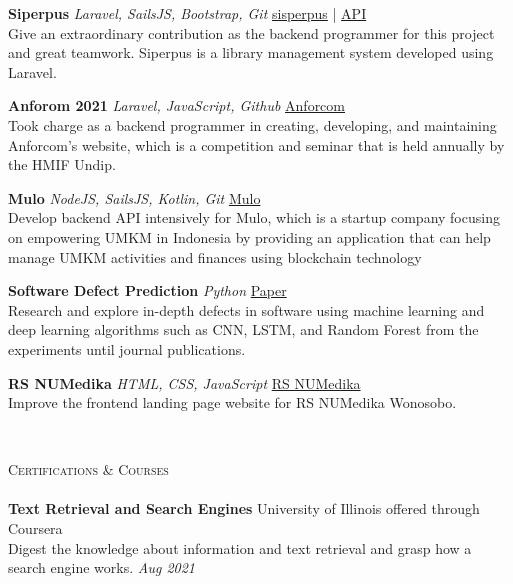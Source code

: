 \documentclass[a4paper]{article}
\newcommand{\lineunder} {
    \vspace*{-8pt} \\
    \hspace*{-18pt} \hrulefill \\
}
\newcommand{\header} [1] {
    {\hspace*{-18pt}\vspace*{6pt} \textsc{#1}}
    \vspace*{-6pt} \lineunder
}
\begin{document}
{\textbf{Siperpus}} {\sl Laravel, SailsJS, Bootstrap, Git} \hfill \href{http://sisperpus.herokuapp.com/}{sisperpus} | \href{https://pbp-siperpus.herokuapp.com/}{API}\\
Give an extraordinary contribution as the backend programmer for this project and great teamwork. Siperpus is a library management system developed using Laravel. \\
\vspace*{2mm}

{\textbf{Anforom 2021}} {\sl Laravel, JavaScript, Github} \hfill \href{https://anforcom.com}{Anforcom}\\
Took charge as a backend programmer in creating, developing, and maintaining Anforcom's website, which is a competition and seminar that is held annually by the HMIF Undip.\\
\vspace*{2mm}

{\textbf{Mulo}} {\sl NodeJS, SailsJS, Kotlin, Git} \hfill \href{https://mulo.app}{Mulo}\\
Develop backend API intensively for Mulo, which is a startup company focusing on empowering UMKM in Indonesia by providing an application that can help manage UMKM activities and finances using blockchain technology\\
\vspace*{2mm}

{\textbf{Software Defect Prediction}} {\sl Python} \hfill \href{https://github.com/mhnaufal/Software-Defect-Finale/blob/main/reports/PAPER-Software%20Defect%20Prediction.pdf}{Paper}\\
Research and explore in-depth defects in software using machine learning and deep learning algorithms such as CNN, LSTM, and Random Forest from the experiments until journal publications.\\
\vspace*{2mm}

{\textbf{RS NUMedika}} {\sl HTML, CSS, JavaScript} \hfill \href{http://rsnuwonosobo.com/}{RS NUMedika}\\
Improve the frontend landing page website for RS NUMedika Wonosobo.\\
\vspace*{2mm}

\

\header{Certifications \& Courses}
\textbf{Text Retrieval and Search Engines} \hfill University of Illinois offered through Coursera\\
Digest the knowledge about information and text retrieval and grasp how a search engine works. \hfill \textit{Aug 2021}\\
\vspace*{2mm}
\end{document}
